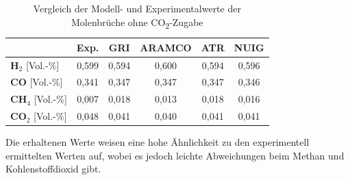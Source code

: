 \documentclass[footmark=none]{tubaf-thesis}
\begin{document}
        \begin{table}[H]
            \centering
            \caption{Vergleich der Modell- und Experimentalwerte der Molenbrüche ohne CO\textsubscript{2}-Zugabe}\label{tab:vergleich_abgaszusammensetzung_keinco2}
            \begin{tabular}{lccccc}
                \toprule
                & \textbf{Exp.} & \textbf{GRI} & \textbf{ARAMCO} & \textbf{ATR} & \textbf{NUIG} \\
                \midrule
                \textbf{H$_2$} [Vol.-\%] & 0,599 & 0,594 & 0,600 & 0,594 & 0,596 \\
                \textbf{CO} [Vol.-\%]& 0,341 & 0,347 & 0,347 & 0,347 & 0,346 \\
                \textbf{CH$_4$} [Vol.-\%]& 0,007 & 0,018 & 0,013 & 0,018 & 0,016 \\
                \textbf{CO$_2$} [Vol.-\%]& 0,048 & 0,041 & 0,040 & 0,041 & 0,041 \\
                \bottomrule
            \end{tabular}
        \end{table}
        Die erhaltenen Werte weisen eine hohe Ähnlichkeit zu den experimentell ermittelten Werten auf, wobei es jedoch leichte Abweichungen beim Methan und Kohlenstoffdioxid gibt. 
\end{document}
